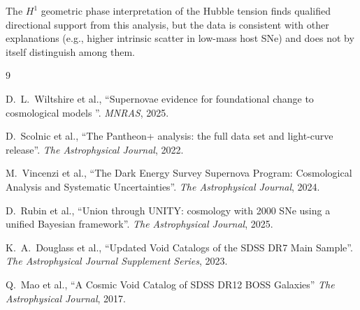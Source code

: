 \documentclass[11pt]{article}
\begin{document}
The $H^1$ geometric phase interpretation of the Hubble tension
finds qualified directional support from this analysis, but the
data is consistent with other explanations (e.g., higher intrinsic
scatter in low-mass host SNe) and does not by itself distinguish
among them.

\begin{thebibliography}{9}

D.~L.~Wiltshire et al.,
``Supernovae evidence for foundational change to cosmological models ''.
\textit{MNRAS}, 2025.

D.~Scolnic et al.,
``The Pantheon+ analysis: the full data set and light-curve release''.
\textit{The Astrophysical Journal}, 2022.

M.~Vincenzi et al.,
``The Dark Energy Survey Supernova Program: Cosmological Analysis and Systematic Uncertainties''.
\textit{The Astrophysical Journal}, 2024.

D.~Rubin et al.,
``Union through UNITY: cosmology with 2000 SNe using a unified Bayesian framework''.
\textit{The Astrophysical Journal}, 2025.

K.~A.~Douglass et al.,
``Updated Void Catalogs of the SDSS DR7 Main Sample''.
\textit{The Astrophysical Journal Supplement Series}, 2023.

Q.~Mao et al.,
``A Cosmic Void Catalog of SDSS DR12 BOSS Galaxies''
\textit{The Astrophysical Journal}, 2017.

\end{thebibliography}
\end{document}
